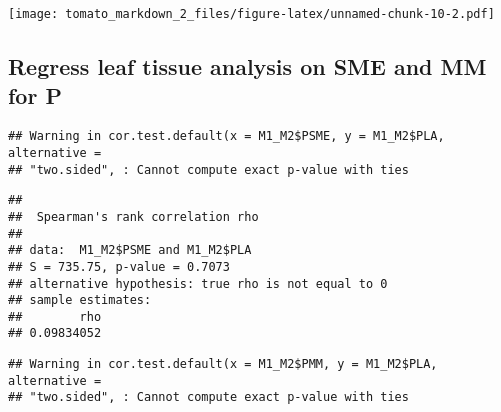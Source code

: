 \documentclass[]{article}
\newenvironment{Shaded}{\begin{snugshade}}{\end{snugshade}}
\newcommand{\KeywordTok}[1]{\textcolor[rgb]{0.13,0.29,0.53}{\textbf{{#1}}}}
\newcommand{\DataTypeTok}[1]{\textcolor[rgb]{0.13,0.29,0.53}{{#1}}}
\newcommand{\StringTok}[1]{\textcolor[rgb]{0.31,0.60,0.02}{{#1}}}
\newcommand{\CommentTok}[1]{\textcolor[rgb]{0.56,0.35,0.01}{\textit{{#1}}}}
\newcommand{\OtherTok}[1]{\textcolor[rgb]{0.56,0.35,0.01}{{#1}}}
\newcommand{\NormalTok}[1]{{#1}}
\begin{document}
\texttt{[image: tomato\_markdown\_2\_files/figure-latex/unnamed-chunk-10-2.pdf]}

\subsection{Regress leaf tissue analysis on SME and MM for
P}\label{regress-leaf-tissue-analysis-on-sme-and-mm-for-p}

\begin{Shaded}
\end{Shaded}

\begin{verbatim}
## Warning in cor.test.default(x = M1_M2$PSME, y = M1_M2$PLA, alternative =
## "two.sided", : Cannot compute exact p-value with ties
\end{verbatim}

\begin{verbatim}
## 
##  Spearman's rank correlation rho
## 
## data:  M1_M2$PSME and M1_M2$PLA
## S = 735.75, p-value = 0.7073
## alternative hypothesis: true rho is not equal to 0
## sample estimates:
##        rho 
## 0.09834052
\end{verbatim}

\begin{Shaded}
\end{Shaded}

\begin{verbatim}
## Warning in cor.test.default(x = M1_M2$PMM, y = M1_M2$PLA, alternative =
## "two.sided", : Cannot compute exact p-value with ties
\end{verbatim}
\end{document}

